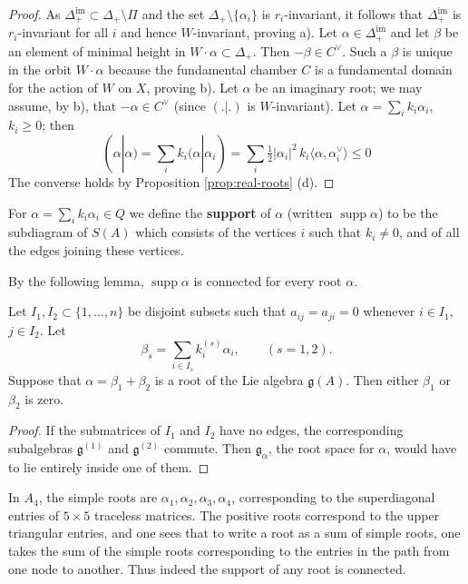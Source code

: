 \documentclass[12pt]{article}
\begin{document}
\begin{proof}
    As $\Delta^{\mathrm{im}}_+ \subset \Delta_+ \setminus \Pi$ and the set
    $\Delta_+\setminus\{\alpha_i\}$ is $r_i$-invariant, it follows
    that $\Delta^{\mathrm{im}}_+$ is $r_i$-invariant for all $i$ and hence
    $W$-invariant, proving a). Let $\alpha \in \Delta^{\mathrm{im}}_+$ and let $\beta$
    be an element of minimal height in $W\cdot\alpha \subset \Delta_+$. Then $-\beta
        \in C^\vee$. Such a $\beta$ is unique in the orbit $W\cdot\alpha$ because the fundamental chamber $C$ is a fundamental domain for the action of $W$ on $X$, proving b). Let $\alpha$ be an imaginary root; we may assume, by b), that
    $-\alpha \in C^\vee$ (since $(.|.)$ is $W$-invariant). Let
    $\alpha = \sum_i k_i \alpha_i$, $k_i \geq 0$; then
    \[
        (\alpha|\alpha) = \sum_i k_i (\alpha|\alpha_i)
        = \sum_i \tfrac{1}{2}|\alpha_i|^2\, k_i \langle \alpha, \alpha_i^\vee \rangle
        \leq 0
    \]
    The converse holds by Proposition \ref{prop:real-roots} (d).
\end{proof}
\begin{definition}
    For $\alpha = \sum_i k_i \alpha_i \in Q$ we define the \textbf{support} of $\alpha$
    (written $\operatorname{supp}\alpha$) to be the subdiagram of $S(A)$ which consists
    of the vertices $i$ such that $k_i \neq 0$, and of all the edges joining these
    vertices.
\end{definition}
By the following lemma, $\operatorname{supp}\alpha$ is connected for every root
$\alpha$.
\begin{lemma}
    Let $I_1, I_2 \subset \{1,\dots,n\}$ be disjoint subsets such that
    $a_{ij} = a_{ji} = 0$ whenever $i \in I_1$, $j \in I_2$.
    Let
    \[
        \beta_s = \sum_{i \in I_s} k_i^{(s)} \alpha_i, \qquad (s=1,2).
    \]
    Suppose that $\alpha = \beta_1 + \beta_2$ is a root of the Lie algebra
    $\mathfrak{g}(A)$. Then either $\beta_1$ or $\beta_2$ is zero.
\end{lemma}
\begin{proof}
    If the submatrices of $I_1$ and $I_2$ have no edges, the corresponding subalgebras $\mathfrak{g}^{(1)}$ and $\mathfrak{g}^{(2)}$ commute. Then $\mathfrak{g}_\alpha$, the root space for $\alpha$, would have to lie entirely inside one of them.
\end{proof}

\begin{example}
    In $A_4$, the simple roots are $\alpha_1, \alpha_2, \alpha_3, \alpha_4$, corresponding to the superdiagonal entries of $5\times 5$ traceless matrices. The positive roots correspond to the upper triangular entries, and one sees that to write a root as a sum of simple roots, one takes the sum of the simple roots corresponding to the entries in the path from one node to another. Thus indeed the support of any root is connected.
\end{example}
\end{document}
